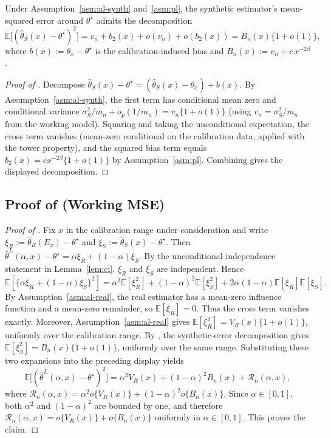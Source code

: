\begin{lemma}\label{lem:Bn}
Under Assumption~\ref{asm:al-synth} and~\ref{asm:pl}, the synthetic estimator's mean-squared error around $\theta^\star$ admits the decomposition
\[
\mathbb{E}\bigl[(\hat\theta_S(x) - \theta^\star)^2\bigr]
= v_n + b_2(x) + o(v_n) + o(b_2(x))
= B_n(x) \{1 + o(1)\},
\]
where $b(x) := \theta_x - \theta^\star$ is the calibration-induced bias and $B_n(x) := v_n + c\,x^{-2\beta}$.
\end{lemma}

\begin{proof}[Proof of ]
Decompose $\hat\theta_S(x) - \theta^\star = (\hat\theta_S(x) - \theta_x) + b(x)$. By Assumption~\ref{asm:al-synth}, the first term has conditional mean zero and conditional variance $\sigma_S^2/m_n + o_p(1/m_n) = v_n\{1+o(1)\}$ (using $v_n = \sigma_S^2/m_n$ from the working model). Squaring and taking the unconditional expectation, the cross term vanishes (mean-zero conditional on the calibration data, applied with the tower property), and the squared bias term equals $b_2(x) = c x^{-2\beta}\{1+o(1)\}$ by Assumption~\ref{asm:pl}. Combining gives the displayed decomposition.
\end{proof}



\subsection{Proof of \texorpdfstring{}{Lemma~\ref{lem:mse-decomp}} (Working MSE)}\label{proof:mse-decomp}

\begin{proof}[Proof of ]
Fix $x$ in the calibration range under consideration and write $\xi_R:=\hat\theta_R(E_x)-\theta^\star$ and $\xi_S:=\hat\theta_S(x)-\theta^\star$. Then $\hat\theta^L(\alpha,x)-\theta^\star=\alpha\xi_R+(1-\alpha)\xi_S$. By the unconditional independence statement in Lemma~\ref{lem:ci}, $\xi_R$ and $\xi_S$ are independent. Hence
\[
\mathbb{E}\left[\{\alpha\xi_R+(1-\alpha)\xi_S\}^2\right]
=
\alpha^2\mathbb{E}[\xi_R^2]
+
(1-\alpha)^2\mathbb{E}[\xi_S^2]
+
2\alpha(1-\alpha)\mathbb{E}[\xi_R]\mathbb{E}[\xi_S].
\]
By Assumption~\ref{asm:al-real}, the real estimator has a mean-zero influence function and a mean-zero remainder, so $\mathbb{E}[\xi_R]=0$. Thus the cross term vanishes exactly. Moreover, Assumption~\ref{asm:al-real} gives $\mathbb{E}[\xi_R^2] = V_R(x)\{1+o(1)\}$, uniformly over the calibration range. By , the synthetic-error decomposition gives $\mathbb{E}[\xi_S^2] = B_n(x)\{1+o(1)\}$, uniformly over the same range. Substituting these two expansions into the preceding display yields
\[
\mathbb{E}\bigl[(\hat\theta^L(\alpha,x)-\theta^\star)^2\bigr]
=
\alpha^2V_R(x)+(1-\alpha)^2B_n(x)+\mathcal R_n(\alpha,x),
\]
where $\mathcal R_n(\alpha,x)=\alpha^2o\{V_R(x)\}+(1-\alpha)^2o\{B_n(x)\}$. Since $\alpha\in[0,1]$, both $\alpha^2$ and $(1-\alpha)^2$ are bounded by one, and therefore $\mathcal R_n(\alpha,x)=o\{V_R(x)\}+o\{B_n(x)\}$ uniformly in $\alpha\in[0,1]$. This proves the claim.
\end{proof}

